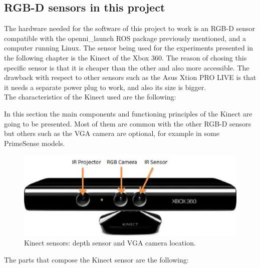 \subsection{RGB-D sensors in this project}

 
The hardware needed for the software of this project to work is an RGB-D sensor compatible with the openni\_launch ROS package previously mentioned, and a computer running Linux. 
The sensor being used for the experiments presented in the following chapter is the Kinect of the Xbox 360. The reason of chosing this specific sensor is that it is cheaper than the other
and also more accessible. The drawback with respect to other sensors such as the Asus Xtion PRO LIVE\cite{xtion} is that it needs a separate power plug to work, and also its size is bigger. 
\\

The characteristics of the Kinect used are the following: 


In this section the main components and functioning principles of the Kinect are going to be presented. Most of them are common with the other RGB-D sensors but others such as the VGA camera are optional, for example in some PrimeSense\cite{PrimeSense} models. 

\begin{figure}[h]
	\begin{center}
\includegraphics[scale=0.5]{img/kinect/kinect2.eps}
	\caption[Kinect Sensors]{Kinect sensors: depth sensor and VGA camera location.}
	\end{center}
\end{figure}


The parts that compose the Kinect sensor are the following: 

